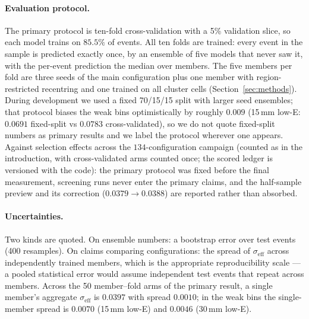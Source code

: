 \documentclass[11pt,a4paper]{article}
\newcommand{\seff}{\ensuremath{\sigma_{\mathrm{eff}}}}
\begin{document}
\paragraph{Evaluation protocol.} The primary protocol is ten-fold
cross-validation with a 5\% validation slice, so each model trains on
$85.5\%$ of events. All ten folds are trained: every event in the sample is
predicted exactly once, by an ensemble of five models that never saw it,
with the per-event prediction the median over members. The five members per
fold are three seeds of the main configuration plus one member with
region-restricted recentring and one trained on all cluster cells
(Section~\ref{sec:methods}). During development we used a fixed 70/15/15
split with larger seed ensembles; that protocol biases the weak bins optimistically by
roughly $0.009$ (15\,mm low-E: $0.0691$ fixed-split vs $0.0783$
cross-validated), so we do not quote fixed-split numbers as primary results and we
label the protocol wherever one appears. Against selection effects across
the $134$-configuration campaign (counted as in the introduction,
with cross-validated arms counted once; the scored ledger is versioned with
the code): the
primary protocol was fixed before the final measurement, screening runs
never enter the primary claims, and the half-sample preview and its correction
($0.0379 \to 0.0388$) are reported rather than absorbed.

\paragraph{Uncertainties.} Two kinds are quoted. On ensemble numbers: a
bootstrap error over test events (400 resamples). On claims comparing
configurations: the spread of \seff{} across independently trained members,
which is the appropriate reproducibility scale --- a pooled statistical error
would assume independent test events that repeat across members. Across the
50 member--fold arms of the primary result, a single member's aggregate
\seff{} is $0.0397$ with spread $0.0010$; in the weak bins the single-member
spread is $0.0070$ (15\,mm low-E) and $0.0046$ (30\,mm low-E).
\end{document}
